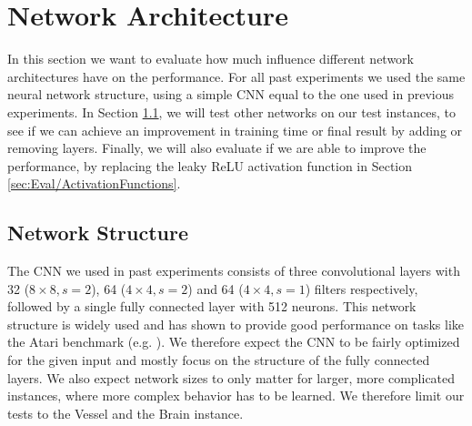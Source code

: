 \section{Network Architecture} \label{sec:EvalNetworks}
In this section we want to evaluate how much influence different network architectures have on the performance. For all past experiments we used the same neural network structure, using a simple CNN equal to the one used in previous experiments. In Section \ref{sec:Eval/NetworkStructure}, we will test other networks on our test instances, to see if we can achieve an improvement in training time or final result by adding or removing layers. Finally, we will also evaluate if we are able to improve the performance, by replacing the leaky ReLU activation function in Section \ref{sec:Eval/ActivationFunctions}.

\subsection{Network Structure} \label{sec:Eval/NetworkStructure}
The CNN we used in past experiments consists of three convolutional layers with 32 ($8 \times 8, s=2$), 64 ($4\times4, s=2$) and 64 ($4 \times 4, s=1$) filters respectively, followed by a single fully connected layer with 512 neurons. This network structure is widely used and has shown to provide good performance on tasks like the Atari benchmark (e.g. \cite{burda2018large, burda2018exploration, mnih2015human}). We therefore expect the CNN to be fairly optimized for the given input and mostly focus on the structure of the fully connected layers. We also expect network sizes to only matter for larger, more complicated instances, where more complex behavior has to be learned. We therefore limit our tests to the Vessel and the Brain instance.


